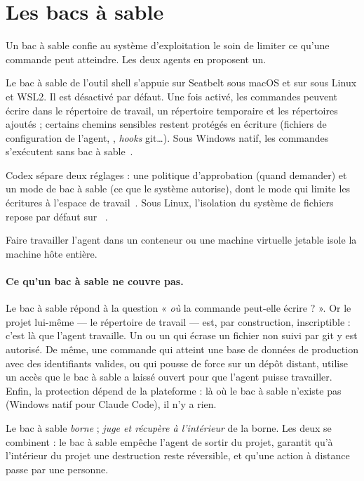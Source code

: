 \section{Les bacs à sable}
\label{sec:sandbox}

Un bac à sable confie au système d'exploitation le soin de limiter ce qu'une commande peut
atteindre. Les deux agents en proposent un.

\begin{description}[style=nextline,leftmargin=0.6cm,font=\sffamily\bfseries]
  \item[Claude Code]
    Le bac à sable de l'outil shell s'appuie sur Seatbelt sous macOS et sur
     sous Linux et WSL2. Il est désactivé par défaut. Une fois activé, les
    commandes peuvent écrire dans le répertoire de travail, un répertoire temporaire et les
    répertoires ajoutés ; certains chemins sensibles restent protégés en écriture (fichiers
    de configuration de l'agent, , \textit{hooks} git\ldots). Sous Windows
    natif, les commandes s'exécutent sans bac à sable~\cite{cc-sandbox}.
  \item[Codex]
    Codex sépare deux réglages : une politique d'approbation (quand demander) et un mode de
    bac à sable (ce que le système autorise), dont le mode  qui limite
    les écritures à l'espace de travail~\cite{codex-security}. Sous Linux, l'isolation du
    système de fichiers repose par défaut sur ~\cite{codex-linux-sandbox}.
  \item[Conteneurs et machines virtuelles]
    Faire travailler l'agent dans un conteneur ou une machine virtuelle jetable isole la
    machine hôte entière.
\end{description}

\paragraph{Ce qu'un bac à sable ne couvre pas.} Le bac à sable répond à la question
« \emph{où} la commande peut-elle écrire ? ». Or le projet lui-même --- le répertoire de
travail --- est, par construction, inscriptible : c'est là que l'agent travaille. Un
 ou un  qui écrase un fichier non suivi par git y est autorisé.
De même, une commande qui atteint une base de données de production avec des identifiants
valides, ou qui pousse de force sur un dépôt distant, utilise un accès que le bac à sable
a laissé ouvert pour que l'agent puisse travailler. Enfin, la protection dépend de la
plateforme : là où le bac à sable n'existe pas (Windows natif pour Claude Code), il n'y a
rien.

\begin{pourquoi}
Le bac à sable \emph{borne} ; \demo{} \emph{juge et récupère à l'intérieur} de la borne.
Les deux se combinent : le bac à sable empêche l'agent de sortir du projet, \demo{}
garantit qu'à l'intérieur du projet une destruction reste réversible, et qu'une action à
distance passe par une personne.
\end{pourquoi}
